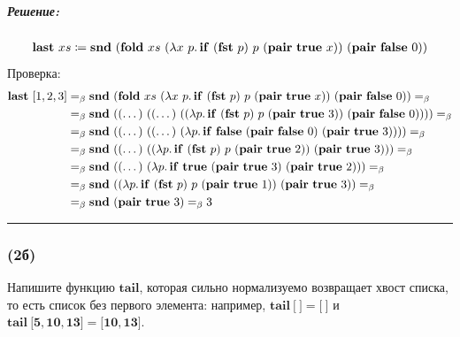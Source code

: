 \documentclass{article}
\newenvironment{proof}{\subparagraph{\hspace{-1em}Решение:\newline}\-}{\par\noindent\rule{\textwidth}{0.4pt}}
\newcommand{\term}[1]{\mathbf{#1}}
\newcommand{\eqbeta}{=_\beta}
\newcommand{\tlist}[1]{\term{[}#1\term{]}} %
\begin{document}
    \begin{proof}
        \begin{gather}
            \term{last}~xs \coloneqq \term{snd}~(\term{fold}~xs~(\lambda x~p\ldotp \term{if}~(\term{fst}~p)~p~(\term{pair}~\term{true}~x))~(\term{pair}~\term{false}~0))
        \end{gather}
        Проверка:
        \begin{align}
            \term{last}~[1, 2, 3] & \eqbeta \term{snd}~(\term{fold}~xs~(\lambda x~p\ldotp \term{if}~(\term{fst}~p)~p~(\term{pair}~\term{true}~x))~(\term{pair}~\term{false}~0)) \eqbeta \\
                                  & \eqbeta \term{snd}~((\dots)~((\dots)~((\lambda p\ldotp \term{if}~(\term{fst}~p)~p~(\term{pair}~\term{true}~3))~(\term{pair}~\term{false}~0)))) \eqbeta \\
                                  & \eqbeta \term{snd}~((\dots)~((\dots)~(\lambda p\ldotp \term{if}~\term{false}~(\term{pair}~\term{false}~0)~(\term{pair}~\term{true}~3)))) \eqbeta \\
                                  & \eqbeta \term{snd}~((\dots)~((\lambda p\ldotp \term{if}~(\term{fst}~p)~p~(\term{pair}~\term{true}~2))~(\term{pair}~\term{true}~3))) \eqbeta \\
                                  & \eqbeta \term{snd}~((\dots)~(\lambda p\ldotp \term{if}~\term{true}~(\term{pair}~\term{true}~3)~(\term{pair}~\term{true}~2))) \eqbeta \\
                                  & \eqbeta \term{snd}~((\lambda p\ldotp \term{if}~(\term{fst}~p)~p~(\term{pair}~\term{true}~1))~(\term{pair}~\term{true}~3)) \eqbeta \\
                                  & \eqbeta \term{snd}~(\term{pair}~\term{true}~3) \eqbeta 3
        \end{align}
    \end{proof}

    \subsubsection{(2б)}

    Напишите функцию $\term{tail}$, которая сильно нормализуемо возвращает хвост списка, то есть список без первого элемента: например, $\term{tail}~\tlist{~} = \tlist{~}$ и $\term{tail}~\tlist{\term{5},\term{10},\term{13}} = \tlist{\term{10}, \term{13}}$.
\end{document}
